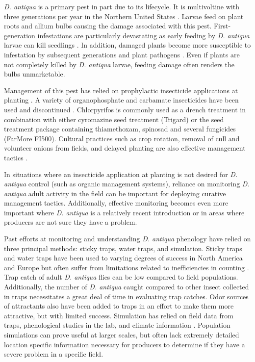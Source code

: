 \documentclass[alpha-refs]{wiley-article}
\begin{document}
\textit{D. antiqua} is a primary pest in part due to its lifecycle.  It is multivoltine with three generations per year in the Northern United States \citep{eckenrode1975population, hoepting2004insecticide}.  Larvae feed on plant roots and allium bulbs causing the damage associated with this pest.  First-generation infestations are particularly devastating as early feeding by \textit{D. antiqua} larvae can kill seedlings \citep{nault2006onion, nault2006performance}.  In addition, damaged plants become more susceptible to infestation by subsequent generations and plant pathogens \citep{eckenrode1986impact,nault2006performance}.  Even if plants are not completely killed by \textit{D. antiqua} larvae, feeding damage often renders the bulbs unmarketable.  

Management of this pest has relied on prophylactic insecticide applications at planting \citep{nault2006performance}.  A variety of organophosphate and carbamate insecticides have been used and discontinued \citep{nault2006performance}.  Chlorpyrifos is commonly used as a drench treatment in combination with either cyromazine seed treatment (Trigard)  \citep{nault2006performance} or the seed treatment package containing thiamethoxam, spinosad and several fungicides (FarMore FI500).  Cultural practices such as crop rotation, removal of cull and volunteer onions from fields, and delayed planting are also effective management tactics  \citep{martinson1988dispersal, finch1985influence, nault2011delaying}.  

In situations where an insecticide application at planting is not desired for \textit{D. antiqua} control (such as organic management systems), reliance on monitoring \textit{D. antiqua} adult activity in the field can be important for deploying curative management tactics. Additionally, effective monitoring becomes even more important where \textit{D. antiqua} is a relatively recent introduction or in areas where producers are not sure they have a problem. 

Past efforts at monitoring and understanding \textit{D. antiqua} phenology have relied on three principal methods: sticky traps, water traps, and simulation.  Sticky traps and water traps have been used to varying degrees of success in North America and Europe but often suffer from limitations related to inefficiencies in counting \citep{thomingdeveloping,otto2000development}.  Trap catch of adult \textit{D. antiqua} flies can be low compared to field populations.  Additionally, the number of \textit{D. antiqua} caught compared to other insect collected in traps necessitates a great deal of time in evaluating trap catches.  Odor sources of attractants also have been added to traps in an effort to make them more attractive, but with limited success.  Simulation has relied on field data from traps, phenological studies in the lab, and climate information \citep{thomingdeveloping,otto2000development,ning2017predicting}.  Population simulations can prove useful at larger scales, but often lack extremely detailed location specific information necessary for producers to determine if they have a severe problem in a specific field.  
\end{document}
